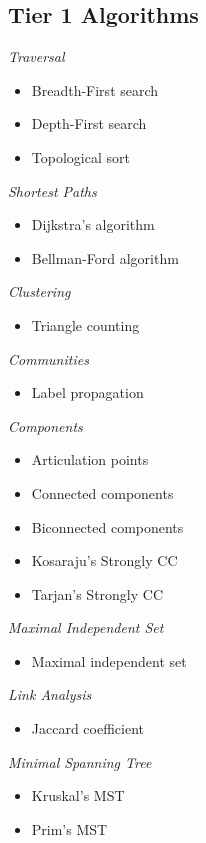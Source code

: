 \subsection{Tier 1 Algorithms}
\begin{multicols}{3}
      \emph{Traversal}
      \begin{itemize}
            \item Breadth-First search
            \item Depth-First search
            \item Topological sort
      \end{itemize}
      \emph{Shortest Paths}
      \begin{itemize}
            \item Dijkstra's algorithm
            \item Bellman-Ford algorithm
      \end{itemize}
      \emph{Clustering}
      \begin{itemize}
            \item Triangle counting
      \end{itemize}
\columnbreak
      \emph{Communities}
      \begin{itemize}
            \item Label propagation
      \end{itemize}
      \emph{Components}
      \begin{itemize}
            \item Articulation points
            \item Connected components
            \item Biconnected components
            \item Kosaraju's Strongly CC
            \item Tarjan's Strongly CC
      \end{itemize}
\columnbreak
      \emph{Maximal Independent Set}
      \begin{itemize}
            \item Maximal independent set
      \end{itemize}
      \emph{Link Analysis}
      \begin{itemize}
            \item Jaccard coefficient
      \end{itemize}
      \emph{Minimal Spanning Tree}
      \begin{itemize}
            \item Kruskal's MST
            \item Prim's MST
      \end{itemize}

\vfill\null
\end{multicols}

